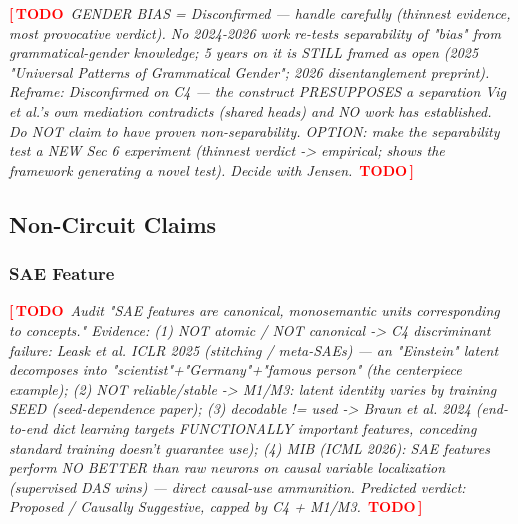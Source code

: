 \documentclass{article}
\newcommand{\TODO}[1]{\par\smallskip\noindent\textcolor{red}{\textbf{[\,TODO}}\ \textit{\textcolor{black!65}{#1}}\ \textcolor{red}{\textbf{TODO\,]}}\par\smallskip}
\begin{document}
\TODO{GENDER BIAS = Disconfirmed --- handle carefully (thinnest evidence, most provocative verdict).
No 2024-2026 work re-tests separability of "bias" from grammatical-gender knowledge; 5 years on it
is STILL framed as open (2025 "Universal Patterns of Grammatical Gender"; 2026 disentanglement
preprint). Reframe: Disconfirmed on C4 --- the construct PRESUPPOSES a separation Vig et al.'s own
mediation contradicts (shared heads) and NO work has established. Do NOT claim to have proven
non-separability. OPTION: make the separability test a NEW Sec 6 experiment (thinnest verdict ->
empirical; shows the framework generating a novel test). Decide with Jensen.}

\subsection{Non-Circuit Claims}
\label{sec:noncircuit}

\subsubsection{SAE Feature}
\TODO{Audit "SAE features are canonical, monosemantic units corresponding to concepts." Evidence:
(1) NOT atomic / NOT canonical -> C4 discriminant failure: Leask et al. ICLR 2025 (stitching /
meta-SAEs) --- an "Einstein" latent decomposes into "scientist"+"Germany"+"famous person" (the
centerpiece example);
(2) NOT reliable/stable -> M1/M3: latent identity varies by training SEED (seed-dependence paper);
(3) decodable != used -> Braun et al. 2024 (end-to-end dict learning targets FUNCTIONALLY
important features, conceding standard training doesn't guarantee use);
(4) MIB (ICML 2026): SAE features perform NO BETTER than raw neurons on causal variable
localization (supervised DAS wins) --- direct causal-use ammunition.
Predicted verdict: Proposed / Causally Suggestive, capped by C4 + M1/M3.}
\end{document}
